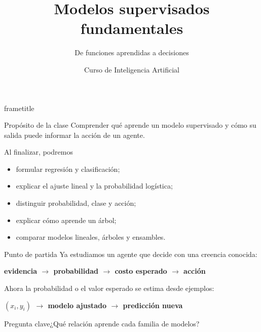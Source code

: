 \documentclass[aspectratio=169,10pt]{beamer}
\title[IA · Clase 7]{Modelos supervisados fundamentales}
\subtitle{De funciones aprendidas a decisiones}
\author{Curso de Inteligencia Artificial}
\institute{Semana 7 · Clase 7}
\date{}
\newcommand{\concepto}[1]{\textcolor{UAPTeal}{\textbf{#1}}}
\newcommand{\pregunta}[1]{\begin{block}{Pregunta clave}#1\end{block}}
\begin{document}
\begin{frame}[plain]
  \begin{beamercolorbox}[wd=\paperwidth,ht=\paperheight,sep=2em]{frametitle}
    \vfill
    {\Huge\bfseries\inserttitle\par}\vspace{.45em}
    {\color{UAPGold}\Large\insertsubtitle\par}\vspace{1.2em}
    \par
    \vfill {\color{UAPGold}\large\insertauthor\par}{\color{white}\insertinstitute\par}
  \end{beamercolorbox}
\end{frame}

\begin{frame}{Propósito de la clase}
  Comprender qué aprende un modelo supervisado y cómo su salida puede informar la acción de un agente.
  \begin{block}{Al finalizar, podremos}
    \begin{itemize}
      \item formular regresión y clasificación;
      \item explicar el ajuste lineal y la probabilidad logística;
      \item distinguir probabilidad, clase y acción;
      \item explicar cómo aprende un árbol;
      \item comparar modelos lineales, árboles y ensambles.
    \end{itemize}
  \end{block}
\end{frame}

\begin{frame}{Punto de partida}
  \small
  Ya estudiamos un agente que decide con una creencia conocida:
  \begin{center}\concepto{evidencia $\rightarrow$ probabilidad $\rightarrow$ costo esperado $\rightarrow$ acción}\end{center}
  Ahora la probabilidad o el valor esperado se estima desde ejemplos:
  \begin{center}\concepto{$(x_i,y_i)$ $\rightarrow$ modelo ajustado $\rightarrow$ predicción nueva}\end{center}
  \pregunta{¿Qué relación aprende cada familia de modelos?}
\end{frame}
\end{document}
